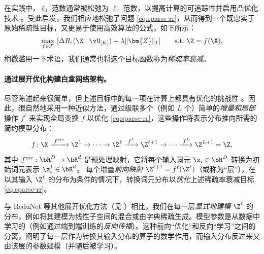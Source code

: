 \documentclass[../../book-main_zh.tex]{subfiles}
\begin{document}
在实践中，$\ell_0$ 范数通常被松弛为 $\ell_1$ 范数，以提高计算的可追踪性并启用凸优化技术 \cite{Wright-Ma-2022}。受此启发，我们相应地松弛了问题 \eqref{eq:sparse-rr}，从而得到一个既忠实于原始稀疏性目标，又更易于使用高效算法的公式，如下所示：
\begin{equation}
    \begin{aligned}
        \max_{f \in \mathcal{F}}\ [\Delta R_{\epsilon}(\Z \mid
        \vU_{[K]}) - \lambda \|\bm{Z}\|_1]  \qquad \text{s.t.}\ \Z = f(\X),
        \label{eq:sparse-rr-1}
    \end{aligned}
\end{equation}
稍微滥用一下术语，我们通常也将这个目标函数称为\textit{稀疏率衰减}。

\paragraph{通过展开优化构建白盒网络架构。}

尽管陈述起来很简单，但上述目标中的每一项在计算上都具有优化的挑战性 \cite{Wright-Ma-2022}。因此，很自然地采用一种近似方法，通过级联多个（例如 $L$ 个）简单的\textit{增量和局部}操作 $f^\ell$ 来实现全局变换 $f$ 以优化 \eqref{eq:sparse-rr}，这些操作将表示分布推向所需的简约模型分布：
\begin{equation}
    f\colon \X \xrightarrow{\hspace{1mm} f^{\mathrm{pre}} \hspace{1mm}}
    \Z^1 \rightarrow \cdots \rightarrow \Z^\ell
    \xrightarrow{\hspace{1mm} f^{\ell} \hspace{1mm}} \Z^{\ell+1}
    \rightarrow  \cdots \xrightarrow{\hspace{1mm} f^{L}} \Z^{L+1} = \Z,
    \label{eq:incremental}
\end{equation}
其中 $f^{\mathrm{pre}}: \bR^{D} \rightarrow \bR^{d}$ 是预处理映射，它将每个输入词元 $\x_{i} \in \bR^{D}$ 转换为初始词元表示 $\z_{i}^{1} \in \bR^{d}$。
每个增量\textit{前向映射} $\Z^{\ell + 1} = f^\ell(\Z^\ell)$（或称为“层”），在以其输入 $\Z^\ell$ 的分布为条件的情况下，转换词元分布以\textit{优化}上述稀疏率衰减目标 \eqref{eq:sparse-rr}。

\begin{remark}
    与 ReduNet 等其他展开优化方法（见 ）相比，我们在每一层\textit{显式地建模} $\Z^\ell$ 的分布，例如将其建模为线性子空间的混合或由字典稀疏生成。模型参数是从数据中学习的（例如通过端到端训练的\textit{反向传播}）。这种前向“优化”和反向“学习”之间的分离，阐明了每一层作为转换其输入分布的算子的数学作用，而输入分布反过来又由该层的参数建模（并随后被学习）。
\end{remark}
\end{document}

